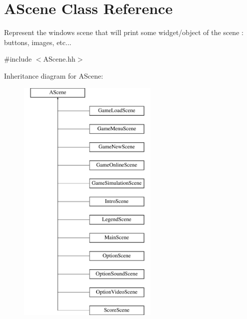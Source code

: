 \hypertarget{classAScene}{}\section{A\+Scene Class Reference}
\label{classAScene}


Represent the window\textquotesingle{}s scene that will print some widget/object of the scene \+: buttons, images, etc...  




{\ttfamily \#include $<$A\+Scene.\+hh$>$}

Inheritance diagram for A\+Scene\+:\begin{figure}[H]
\begin{center}
\leavevmode
\includegraphics[height=12.000000cm]{classAScene}
\end{center}
\end{figure}
